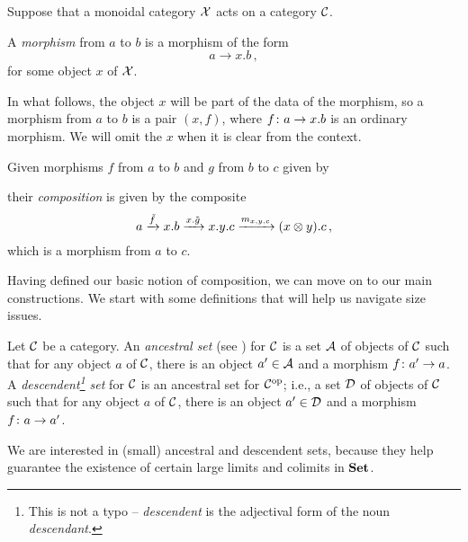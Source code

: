 Suppose that a monoidal category $\mathcal X$ acts on a category ${\mathcal{C}}$.
\begin{definition}
  A \emph{\Mellies morphism} from $a$ to $b$ is a morphism of the form
  \[
    a \to x.b\,,
    \]
  for some object $x$ of $\mathcal X$.
\end{definition}

\begin{remark}
  In what follows, the object $x$ will be part of the data of the \Mellies morphism, so a \Mellies morphism from $a$ to $b$ is a pair $(x,f)$, where $f\colon a \to x.b$ is an ordinary morphism.  
  We will omit the $x$ when it is clear from the context.
\end{remark}

\begin{definition}
  Given \Mellies morphisms $f$ from $a$ to $b$ and $g$ from $b$ to $c$ given by
  their \emph{\Mellies composition} is given by the composite
  \[
    a \xrightarrow{\tilde f}
    x.b \xrightarrow{x.\tilde g}
    x.y.c \xrightarrow{m_{x,y,c}}
    (x\otimes y).c\,,
    \]
  which is a \Mellies morphism from $a$ to $c$.
  \label{DefMelliesComposition}
\end{definition}

Having defined our basic notion of composition, we can move on to our main constructions.
We start with some definitions that will help us navigate size issues.

\begin{definition}
  Let ${\mathcal{C}}$ be a category.  
  An \emph{ancestral set} (see \cite{AllGoodCategories}) for ${\mathcal{C}}$ is a set ${\mathcal{A}}$ of objects of ${\mathcal{C}}$ such that for any object $a$ of ${\mathcal{C}}$, there is an object $a'\in{\mathcal{A}}$ and a morphism $f \colon a' \to a$.
  A \emph{descendent\footnote{This is not a typo -- \emph{descendent} is the adjectival form of the noun \emph{descendant}.} set} for ${\mathcal{C}}$ is an ancestral set for ${\mathcal{C}}^{\mathrm{op}}$; i.e., a set ${\mathcal{D}}$ of objects of ${\mathcal{C}}$ such that for any object $a$ of ${\mathcal{C}}$, there is an object $a'\in{\mathcal{D}}$ and a morphism $f \colon a \to a'$.
\end{definition}

We are interested in (small) ancestral and descendent sets, because they help guarantee the existence of certain large limits and colimits in ${\normalfont\textbf{Set}}$.

